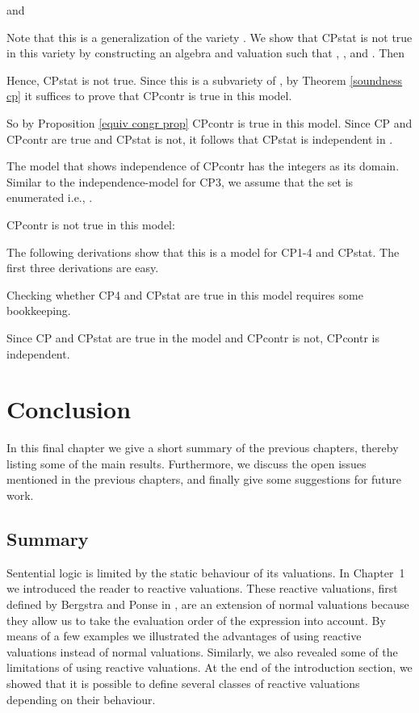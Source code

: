 \documentclass[a4paper,twoside,openright]{report}
\begin{document}
and

Note that this is a generalization of the variety . We show that CPstat is not true in this variety by constructing an algebra  and valuation  such that , ,  and . Then

Hence, CPstat is not true. Since this is a subvariety of , by Theorem \ref{soundness cp} it suffices to prove that CPcontr is true in this model.

So by Proposition \ref{equiv congr prop} CPcontr is true in this model. Since CP and CPcontr are true and CPstat is not, it follows that CPstat is independent in .

The model that shows independence of CPcontr has the integers as its domain. Similar to the independence-model for CP3, we assume that the set  is enumerated i.e., .

CPcontr is not true in this model:


The following derivations show that this is a model for CP1-4 and CPstat. The first three derivations are easy.





Checking whether CP4 and CPstat are true in this model requires some bookkeeping.



Since CP and CPstat are true in the model and CPcontr is not, CPcontr is independent.



\chapter{Conclusion}
In this final chapter we give a short summary of the previous chapters, thereby listing some of the main results. Furthermore, we discuss the open issues mentioned in the previous chapters, and finally give some suggestions for future work.

\section{Summary}
Sentential logic is limited by the static behaviour of its valuations. In Chapter~1 we introduced the reader to reactive valuations. These reactive valuations, first defined by Bergstra and Ponse in \cite{main}, are an extension of normal valuations because they allow us to take the evaluation order of the expression into account. By means of a few examples we illustrated the advantages of using reactive valuations instead of normal valuations. Similarly, we also revealed some of the limitations of using reactive valuations. At the end of the introduction section, we showed that it is possible to define several classes of reactive valuations depending on their behaviour.
\end{document}
